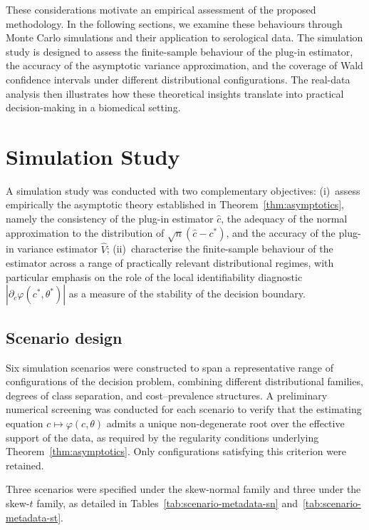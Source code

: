 \documentclass[11pt,a4paper]{article}
\theoremstyle{definition}
\theoremstyle{remark}
\newcommand{\1}{\mathbf{1}}
\begin{document}
These considerations motivate an empirical assessment of the proposed methodology. In the following sections, we examine these behaviours through Monte Carlo simulations and their application to serological data. The simulation study is designed to assess the finite-sample behaviour of the plug-in estimator, the accuracy of the asymptotic variance approximation, and the coverage of Wald confidence intervals under different distributional configurations. The real-data analysis then illustrates how these theoretical insights translate into practical
decision-making in a biomedical setting.

\section{Simulation Study}
\label{sec:simulation}

A simulation study was conducted with two complementary objectives:
(i)~assess empirically the asymptotic theory established in
Theorem~\ref{thm:asymptotics}, namely the consistency of the plug-in
estimator $\hat{c}$, the adequacy of the normal approximation to the
distribution of $\sqrt{n}(\hat{c} - c^*)$, and the accuracy of the
plug-in variance estimator $\hat{V}$; (ii)~characterise the
finite-sample behaviour of the estimator across a range of practically
relevant distributional regimes, with particular emphasis on the role of
the local identifiability diagnostic $|\partial_c\varphi(c^*,\theta^*)|$
as a measure of the stability of the decision boundary.

\subsection{Scenario design}

Six simulation scenarios were constructed to span a
representative range of configurations of the decision
problem, combining different distributional families,
degrees of class separation, and cost--prevalence
structures. A preliminary numerical screening was conducted for each scenario to verify that the estimating equation $c\mapsto\varphi(c,\theta)$ admits a unique non-degenerate root over the effective support of the data, as required by the regularity conditions underlying Theorem~\ref{thm:asymptotics}.
Only configurations satisfying this criterion were retained.

Three scenarios were specified under the skew-normal family and three under the skew-$t$ family, as detailed in Tables~\ref{tab:scenario-metadata-sn}
and~\ref{tab:scenario-metadata-st}.
\end{document}

